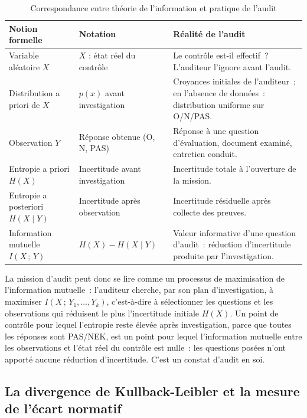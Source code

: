 \begin{table}[H]
\centering
\small
\caption{Correspondance entre théorie de l'information et pratique de l'audit}
\label{tab:analogie-audit}
\begin{tabular}{p{4.5cm}p{4.5cm}p{4.5cm}}
\toprule
\textbf{Notion formelle} & \textbf{Notation} & \textbf{Réalité de l'audit} \\
\midrule
Variable aléatoire $X$ &
$X$ : état réel du contrôle &
Le contrôle est-il effectif~? L'auditeur l'ignore avant l'audit. \\
\addlinespace
Distribution a priori de $X$ &
$p(x)$ avant investigation &
Croyances initiales de l'auditeur~; en l'absence de données~: 
distribution uniforme sur O/N/PAS. \\
\addlinespace
Observation $Y$ &
Réponse obtenue (O, N, PAS) &
Réponse à une question d'évaluation, document examiné, entretien conduit. \\
\addlinespace
Entropie a priori $H(X)$ &
Incertitude avant investigation &
Incertitude totale à l'ouverture de la mission. \\
\addlinespace
Entropie a posteriori $H(X \mid Y)$ &
Incertitude après observation &
Incertitude résiduelle après collecte des preuves. \\
\addlinespace
Information mutuelle $I(X\,;\,Y)$ &
$H(X) - H(X \mid Y)$ &
Valeur informative d'une question d'audit~: réduction d'incertitude produite
par l'investigation. \\
\bottomrule
\end{tabular}
\end{table}

La mission d'audit peut donc se lire comme un processus de maximisation de
l'information mutuelle~: l'auditeur cherche, par son plan d'investigation, à
maximiser $I(X\,;\,Y_1, \ldots, Y_k)$, c'est-à-dire à sélectionner les questions
et les observations qui réduisent le plus l'incertitude initiale $H(X)$. Un
point de contrôle pour lequel l'entropie reste élevée après investigation, parce
que toutes les réponses sont PAS/NEK, est un point pour lequel l'information
mutuelle entre les observations et l'état réel du contrôle est nulle~: les
questions posées n'ont apporté aucune réduction d'incertitude. C'est un constat
d'audit en soi.

\subsection{La divergence de Kullback-Leibler et la mesure de l'écart normatif}

